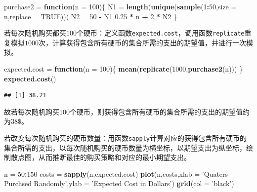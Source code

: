 \documentclass[]{article}
\newenvironment{Shaded}{\begin{snugshade}}{\end{snugshade}}
\newcommand{\ControlFlowTok}[1]{\textcolor[rgb]{0.13,0.29,0.53}{\textbf{#1}}}
\newcommand{\DataTypeTok}[1]{\textcolor[rgb]{0.13,0.29,0.53}{#1}}
\newcommand{\DecValTok}[1]{\textcolor[rgb]{0.00,0.00,0.81}{#1}}
\newcommand{\FloatTok}[1]{\textcolor[rgb]{0.00,0.00,0.81}{#1}}
\newcommand{\KeywordTok}[1]{\textcolor[rgb]{0.13,0.29,0.53}{\textbf{#1}}}
\newcommand{\NormalTok}[1]{#1}
\newcommand{\OperatorTok}[1]{\textcolor[rgb]{0.81,0.36,0.00}{\textbf{#1}}}
\newcommand{\OtherTok}[1]{\textcolor[rgb]{0.56,0.35,0.01}{#1}}
\newcommand{\StringTok}[1]{\textcolor[rgb]{0.31,0.60,0.02}{#1}}
\begin{document}
\begin{Shaded}
\begin{Highlighting}[]
\NormalTok{purchase2 =}\StringTok{ }\ControlFlowTok{function}\NormalTok{(}\DataTypeTok{n =} \DecValTok{100}\NormalTok{)\{}
\NormalTok{  N1 =}\StringTok{ }\KeywordTok{length}\NormalTok{(}\KeywordTok{unique}\NormalTok{(}\KeywordTok{sample}\NormalTok{(}\DecValTok{1}\OperatorTok{:}\DecValTok{50}\NormalTok{,}\DataTypeTok{size =}\NormalTok{ n,}\DataTypeTok{replace =} \OtherTok{TRUE}\NormalTok{)))}
\NormalTok{  N2 =}\StringTok{ }\DecValTok{50} \OperatorTok{-}\StringTok{ }\NormalTok{N1}
  \FloatTok{0.25} \OperatorTok{*}\StringTok{ }\NormalTok{n }\OperatorTok{+}\StringTok{ }\DecValTok{2} \OperatorTok{*}\StringTok{ }\NormalTok{N2}
\NormalTok{\}}
\end{Highlighting}
\end{Shaded}

若每次随机购买都买\(100\)个硬币：定义函数\texttt{expected.cost}，调用函数\texttt{replicate}重复模拟\(1000\)次，计算获得包含所有硬币的集合所需的支出的期望值，并进行一次模拟。

\begin{Shaded}
\begin{Highlighting}[]
\NormalTok{expected.cost =}\StringTok{ }\ControlFlowTok{function}\NormalTok{(}\DataTypeTok{n =} \DecValTok{100}\NormalTok{)\{}
  \KeywordTok{mean}\NormalTok{(}\KeywordTok{replicate}\NormalTok{(}\DecValTok{1000}\NormalTok{,}\KeywordTok{purchase2}\NormalTok{(n)))}
\NormalTok{\}}
\KeywordTok{expected.cost}\NormalTok{()}
\end{Highlighting}
\end{Shaded}

\begin{verbatim}
## [1] 38.21
\end{verbatim}

故若每次随机购买\(100\)个硬币，则获得包含所有硬币的集合所需的支出的期望值约为\(38\$\)。

若改变每次随机购买的硬币数量：用函数\texttt{sapply}计算对应的获得包含所有硬币的集合所需的支出，以每次随机购买的硬币数量为横坐标，以期望支出为纵坐标，绘制散点图，从而推断最佳的购买策略和对应的最小期望支出。

\begin{Shaded}
\begin{Highlighting}[]
\NormalTok{n =}\StringTok{ }\DecValTok{50}\OperatorTok{:}\DecValTok{150}
\NormalTok{costs =}\StringTok{ }\KeywordTok{sapply}\NormalTok{(n,expected.cost)}
\KeywordTok{plot}\NormalTok{(n,costs,}\DataTypeTok{xlab =} \StringTok{'Quaters Purchsed Randomly'}\NormalTok{,}\DataTypeTok{ylab =} \StringTok{'Expected Cost in Dollars'}\NormalTok{)}
\KeywordTok{grid}\NormalTok{(}\DataTypeTok{col =} \StringTok{'black'}\NormalTok{)}
\end{Highlighting}
\end{Shaded}
\end{document}
